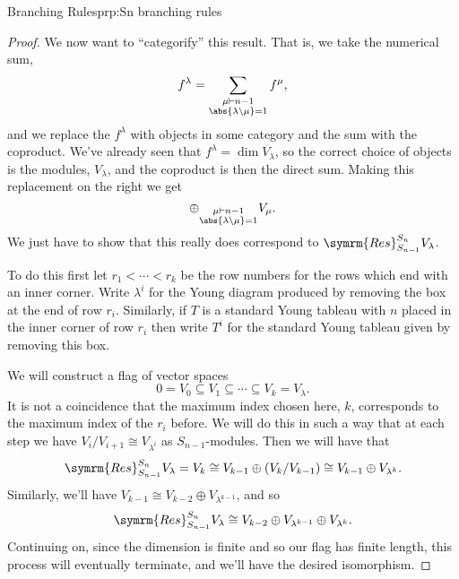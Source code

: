 \documentclass[fleqn]{NotesClass}
\newcommand{\isomorphic}{\cong}
\newcommand{\partition}{\vdash}
\newcommand{\Res}{\symrm{Res}}
\begin{document}
\begin{prp}{Branching Rules}{prp:Sn branching rules}
\begin{proof}
            We now want to \enquote{categorify} this result.
            That is, we take the numerical sum,
            \begin{equation}
                f^\lambda = \sum_{\substack{\mu \partition n-1\\ \abs{\lambda\setminus \mu} = 1}} f^\mu,
            \end{equation}
            and we replace the \(f^\lambda\) with objects in some category and the sum with the coproduct.
            We've already seen that \(f^\lambda = \dim V_\lambda\), so the correct choice of objects is the modules, \(V_\lambda\), and the coproduct is then the direct sum.
            Making this replacement on the right we get
            \begin{equation}
                \oplus_{\substack{\mu \partition n-1\\ \abs{\lambda\setminus \mu} = 1}} V_\mu.
            \end{equation}
            We just have to show that this really does correspond to \(\Res^{S_n}_{S_{n-1}}V_\lambda\).
            
            To do this first let \(r_1 < \dotsb < r_k\) be the row numbers for the rows which end with an inner corner.
            Write \(\lambda^i\) for the Young diagram produced by removing the box at the end of row \(r_i\).
            Similarly, if \(T\) is a standard Young tableau with \(n\) placed in the inner corner of row \(r_i\) then write \(T^i\) for the standard Young tableau given by removing this box.
            
            We will construct a flag of vector spaces
            \begin{equation}
                0 = V_0 \subseteq V_1 \subseteq \dotsb \subseteq V_k = V_\lambda.
            \end{equation}
            It is not a coincidence that the maximum index chosen here, \(k\), corresponds to the maximum index of the \(r_i\) before.
            We will do this in such a way that at each step we have \(V_i/V_{i+1} \isomorphic V_{\lambda^i}\) as \(S_{n-1}\)-modules.
            Then we will have that
            \begin{equation}
                \Res^{S_n}_{S_{n-1}} V_\lambda = V_k \isomorphic V_{k-1} \oplus (V_k/V_{k-1}) \isomorphic V_{k-1} \oplus V_{\lambda^k}.
            \end{equation}
            Similarly, we'll have \(V_{k-1} \isomorphic V_{k-2} \oplus V_{\lambda^{k-1}}\), and so
            \begin{equation}
                \Res^{S_n}_{S_{n-1}} V_\lambda \isomorphic V_{k-2} \oplus V_{\lambda^{k-1}} \oplus V_{\lambda^k}.
            \end{equation}
            Continuing on, since the dimension is finite and so our flag has finite length, this process will eventually terminate, and we'll have the desired isomorphism.
            

\end{proof}
\end{prp}
\end{document}
